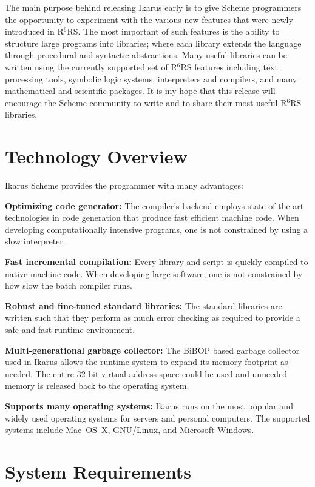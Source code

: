 \documentclass[onecolumn, 12pt, twoside, openright, dvipdfm]{book}
\newcommand{\rnrs}[1]{R$^{\mathrm{#1}}$RS}
\begin{document}
The main purpose behind releasing Ikarus early is to give Scheme
programmers the opportunity to experiment with the various new
features that were newly introduced in \rnrs{6}.  The most important
of such features is the ability to structure large programs into
libraries; where each library extends the language through
procedural and syntactic abstractions.  Many useful libraries can be
written using the currently supported set of \rnrs{6} features
including text processing tools, symbolic logic systems,
interpreters and compilers, and many mathematical and scientific
packages.  It is my hope that this release will encourage the
Scheme community to write and to share their most useful \rnrs{6}
libraries.


\newpage

\section{Technology Overview}

Ikarus Scheme provides the programmer with many advantages:

\textbf{Optimizing code generator:}  The compiler's backend employs
state of the art technologies in code generation that produce fast
efficient machine code.  When developing computationally intensive
programs, one is not constrained by using a slow interpreter.

\textbf{Fast incremental compilation:}  Every library and script is
quickly compiled to native machine code.  When developing large
software, one is not constrained by how slow the batch compiler
runs.

\textbf{Robust and fine-tuned standard libraries:}  The standard
libraries are written such that they perform as much error checking
as required to provide a safe and fast runtime environment. 

\textbf{Multi-generational garbage collector:} The
BiBOP\cite{dybvig:sm} based garbage collector used in Ikarus allows
the runtime system to expand its memory footprint as needed.  The
entire 32-bit virtual address space could be used and unneeded
memory is released back to the operating system.

\textbf{Supports many operating systems:} Ikarus runs on the most
popular and widely used operating systems for servers and personal
computers.  The supported systems include Mac~OS~X,
GNU/Linux, and Microsoft Windows.


\section{System Requirements}
\end{document}

